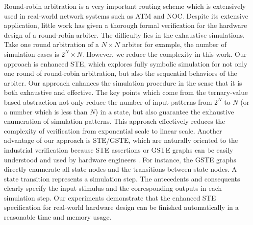 \documentclass[final]{IEEEtran}
\begin{document}
Round-robin arbitration is a very important routing scheme which
is extensively used in real-world network systems such as ATM and
NOC. Despite its extensive application, little work has given a
thorough formal verification for the hardware design of a
round-robin arbiter. The difficulty lies in the   exhaustive
simulations. Take one round arbitration of a $ N\times N$ arbiter
for example, the number of simulation cases is $2^N\times N$.
However, we reduce the complexity in this work. Our
approach is enhanced STE, which explores fully symbolic simulation
for not only one round of round-robin arbitration, but also the
sequential behaviors of the arbiter. Our approach enhances the
simulation procedure in the sense that it is both
exhaustive and effective. The key points which come from the ternary-value
based abstraction not only reduce the number of input
patterns from $2^N$ to $N$ (or a number which is less than $N$) in a
state, but also guarantee the exhaustive enumeration of simulation
patterns. This approach effectively reduces the complexity of
verification from exponential scale to linear scale. Another
advantage of our approach is STE/GSTE, which are   naturally
oriented to the industrial verification because STE assertions or
GSTE graphs can be easily understood and used by hardware engineers
\cite{DBLP:conf/atva/Yang06}. For instance, the GSTE graphs directly
enumerate all state nodes and the transitions between state nodes. A
state transition represents a simulation step. The antecedents and
consequents clearly specify the input stimulus and the corresponding
outputs in each simulation step.  Our experiments demonstrate that
the enhanced STE specification for real-world hardware design can be
finished automatically in a reasonable time and memory usage.



\end{document}
